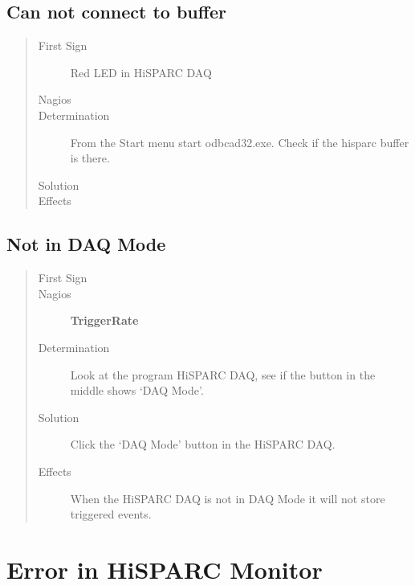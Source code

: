 \documentclass[a4paper,11pt,english]{sphinxmanual}
\begin{document}
\subsection{Can not connect to buffer}
\label{known-issues:can-not-connect-to-buffer}\begin{quote}\begin{description}
\item[{First Sign}] \leavevmode
Red LED in HiSPARC DAQ

\item[{Nagios}] \leavevmode
\item[{Determination}] \leavevmode
From the Start menu start odbcad32.exe. Check if the hisparc buffer is there.

\item[{Solution}] \leavevmode
\item[{Effects}] \leavevmode
\end{description}\end{quote}


\subsection{Not in DAQ Mode}
\label{known-issues:not-in-daq-mode}\begin{quote}\begin{description}
\item[{First Sign}] \leavevmode
\item[{Nagios}] \leavevmode
\textbf{TriggerRate}

\item[{Determination}] \leavevmode
Look at the program HiSPARC DAQ, see if the button in the middle shows `DAQ Mode'.

\item[{Solution}] \leavevmode
Click the `DAQ Mode' button in the HiSPARC DAQ.

\item[{Effects}] \leavevmode
When the HiSPARC DAQ is not in DAQ Mode it will not store triggered events.

\end{description}\end{quote}


\section{Error in HiSPARC Monitor}
\label{known-issues:error-in-hisparc-monitor}
\end{document}
